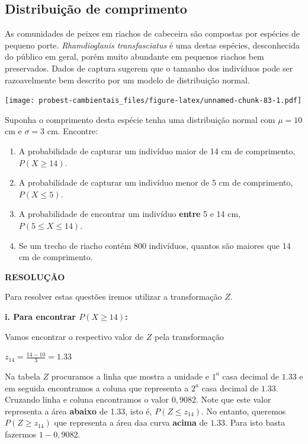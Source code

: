 \documentclass[
]{book}
\providecommand{\tightlist}{%
  \setlength{\itemsep}{0pt}\setlength{\parskip}{0pt}}
\begin{document}
\hypertarget{distribuiuxe7uxe3o-de-comprimento}{%
\subsection{Distribuição de comprimento}\label{distribuiuxe7uxe3o-de-comprimento}}

As comunidades de peixes em riachos de cabeceira são compostas por espécies de pequeno porte. \emph{Rhamdioglanis transfasciatus} é uma destas espécies, desconhecida do público em geral, porém muito abundante em pequenos riachos bem preservados. Dados de captura sugerem que o tamanho dos indivíduos pode ser razoavelmente bem descrito por um modelo de distribuição normal.

\texttt{[image: probest-cambientais\_files/figure-latex/unnamed-chunk-83-1.pdf]}

Suponha o comprimento desta espécie tenha uma distribuição normal com \(\mu = 10\) cm e \(\sigma = 3\) cm. Encontre:

\begin{enumerate}
\def\labelenumi{\roman{enumi}.}
\tightlist
\item
  A probabilidade de capturar um indivíduo maior de 14 cm de comprimento, \(P(X \ge 14)\).
\item
  A probabilidade de capturar um indivíduo menor de 5 cm de comprimento, \(P(X \le 5)\).
\item
  A probabilidade de encontrar um indivíduo \textbf{entre} 5 e 14 cm, \(P(5 \le X \le 14)\).
\item
  Se um trecho de riacho contém 800 indivíduos, quantos são maiores que 14 cm de comprimento.
\end{enumerate}

\textbf{RESOLUÇÃO}

Para resolver estas questões iremos utilizar a transformação \(Z\).

\textbf{i. Para encontrar \(P(X \ge 14)\):}

Vamos encontrar o respectivo valor de \(Z\) pela transformação

\(z_{14} = \frac{14 - 10}{3} = 1.33\)

Na tabela \(Z\) procuramos a linha que mostra a unidade e \(1^a\) casa decimal de \(1.33\) e em seguida encontramos a coluna que representa a \(2^a\) casa decimal de \(1.33\). Cruzando linha e coluna encontramos o valor \(0,9082\). Note que este valor representa a área \textbf{abaixo} de 1.33, isto é, \(P(Z \le z_{14})\). No entanto, queremos \(P(Z \ge z_{14})\) que representa a área daa curva \textbf{acima} de \(1.33\). Para isto basta fazermos \(1 - 0,9082\).
\end{document}
